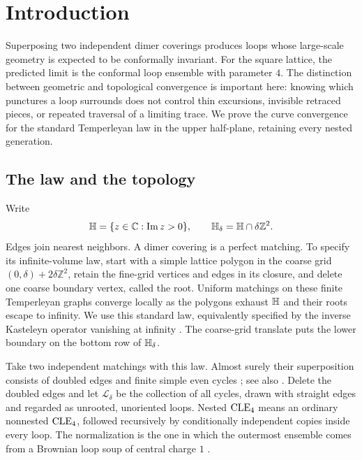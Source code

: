 \section{Introduction}\label{sec:introduction}

Superposing two independent dimer coverings produces loops whose large-scale
geometry is expected to be conformally invariant. For the square lattice, the
predicted limit is the conformal loop ensemble with parameter \(4\). The
distinction between geometric and topological convergence is important here:
knowing which punctures a loop surrounds does not control thin excursions,
invisible retraced pieces, or repeated traversal of a limiting trace.
We prove the curve convergence for the standard Temperleyan law in the upper
half-plane, retaining every nested generation.

\subsection{The law and the topology}
Write
\[
 \mathbb H=\{z\in\mathbb C:\operatorname{Im}z>0\},\qquad
 \mathbb H_\delta=\mathbb H\cap\delta\mathbb Z^2 .
\]
Edges join nearest neighbors. A dimer covering is a perfect matching.
To specify its infinite-volume law, start with a simple lattice polygon in
the coarse grid \((0,\delta)+2\delta\mathbb Z^2\), retain the fine-grid
vertices and edges in its closure, and delete one coarse boundary vertex,
called the root. Uniform matchings on these finite Temperleyan graphs
converge locally as the polygons exhaust \(\mathbb H\) and their roots escape to
infinity. We use this standard law, equivalently specified by the inverse
Kasteleyn operator vanishing at infinity \cite[Section~2]{BI}.
The coarse-grid translate puts the lower boundary on the bottom row of
\(\mathbb H_\delta\).

Take two independent matchings with this law. Almost surely their
superposition consists of doubled edges and finite simple even cycles
\cite[opening of Section~2]{BI}; see also \cite[Section~5.4, Lemma~26]{Dubedat}.
Delete the doubled edges and let
\(\mathcal L_\delta\) be the collection of all cycles, drawn with straight
edges and regarded as unrooted, unoriented loops.
Nested \(\mathrm{CLE}_4\) means an ordinary nonnested \(\mathrm{CLE}_4\), followed recursively
by conditionally independent copies inside every loop. The normalization is
the one in which the outermost ensemble comes from a Brownian loop soup of
central charge \(1\) \cite{SW}.

